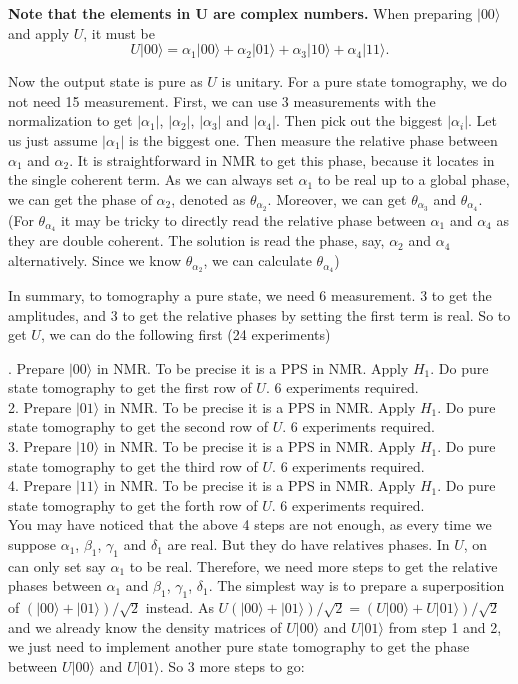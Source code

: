 \documentclass[12pt,nofootinbib,notitlepage,onecolumn,superscriptaddress]{revtex4-1}
\theoremstyle{plain}
\theoremstyle{definition}
\newcommand{\ket}[1]{\ensuremath{|#1\rangle}}
\newcommand{\be}{\begin{equation}}
\newcommand{\ee}{\end{equation}}
\begin{document}
\textbf{Note that the elements in U are complex numbers. } When preparing $\ket{00}$ and apply $U$, it must be
\be
U\ket{00} = \alpha_1\ket{00}+\alpha_2\ket{01}+\alpha_3\ket{10}+\alpha_4\ket{11}.
\ee

Now the output state is pure as $U$ is unitary. For a pure state tomography, we do not need 15 measurement. First, we can use 3 measurements with the normalization to get $|\alpha_1|$, $|\alpha_2|$, $|\alpha_3|$ and $|\alpha_4|$. Then pick out the biggest $|\alpha_i|$. Let us just assume $|\alpha_1|$ is the biggest one. Then measure the relative phase between $\alpha_1$ and $\alpha_2$. It is straightforward in NMR to get this phase, because it locates in the single coherent term. As we can always set $\alpha_1$ to be real up to a global phase, we can get the phase of $\alpha_2$, denoted as $\theta_{\alpha_2}$. Moreover, we can get $\theta_{\alpha_3}$ and $\theta_{\alpha_4}$. (For $\theta_{\alpha_4}$ it may be tricky to directly read the relative phase between $\alpha_1$ and $\alpha_4$ as they are double coherent. The solution is read the phase, say, $\alpha_2$ and $\alpha_4$ alternatively. Since we know $\theta_{\alpha_2}$, we can calculate $\theta_{\alpha_4}$)

In summary, to tomography a pure state, we need 6 measurement. 3 to get the amplitudes, and 3 to get the relative phases by setting the first term is real. So to get $U$, we can do the following first (24 experiments)

\medskip

. Prepare \ket{00} in NMR. To be precise it is a PPS in NMR. Apply $H_1$. Do pure state tomography to get the first row of $U$. 6 experiments required.\\
2. Prepare \ket{01} in NMR. To be precise it is a PPS in NMR. Apply $H_1$. Do pure state tomography to get the second row of $U$. 6 experiments required.\\
3. Prepare \ket{10} in NMR. To be precise it is a PPS in NMR. Apply $H_1$. Do pure state tomography to get the third row of $U$. 6 experiments required.\\
4. Prepare \ket{11} in NMR. To be precise it is a PPS in NMR. Apply $H_1$. Do pure state tomography to get the forth row of $U$. 6 experiments required.\\

You may have noticed that the above 4 steps are not enough, as every time we suppose $\alpha_1$, $\beta_1$, $\gamma_1$ and $\delta_1$ are real. But they do have relatives phases. In $U$, on can only set say $\alpha_1$ to be real. Therefore, we need more steps to get the relative phases between $\alpha_1$ and $\beta_1$, $\gamma_1$, $\delta_1$. The simplest way is to prepare a superposition of $(\ket{00}+\ket{01})/\sqrt{2}$ instead. As $U(\ket{00}+\ket{01})/\sqrt{2} = (U\ket{00}+U\ket{01})/\sqrt{2}$ and we already know the density matrices of  $U\ket{00}$ and $U\ket{01}$ from step 1 and 2, we just need to implement another pure state tomography to get the phase between $U\ket{00}$ and $U\ket{01}$. So 3 more steps to go:
\end{document}
